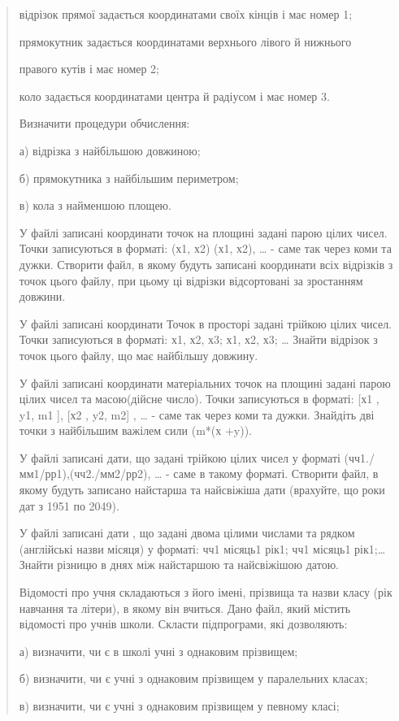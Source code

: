 \documentclass[]{article}
\begin{document}
\begin{quote}
відрізок прямої задається координатами своїх кінців і має номер 1;

прямокутник задається координатами верхнього лівого й нижнього

правого кутів і має номер 2;

коло задається координатами центра й радіусом і має номер 3.

Визначити процедури обчислення:

а) відрізка з найбільшою довжиною;

б) прямокутника з найбільшим периметром;

в) кола з найменшою площею.

У файлі записані координати точок на площині задані парою цілих чисел.
Точки записуються в форматі: (х1, х2) (х1, х2), \ldots{} - саме так
через коми та дужки. Створити файл, в якому будуть записані координати
всіх відрізків з точок цього файлу, при цьому ці відрізки відсортовані
за зростанням довжини.

У файлі записані координати Точок в просторі задані трійкою цілих чисел.
Точки записуються в форматі: х1, х2, х3; х1, х2, х3; \ldots{} Знайти
відрізок з точок цього файлу, що має найбільшу довжину.

У файлі записані координати матеріальних точок на площині задані парою
цілих чисел та масою(дійсне число). Точки записуються в форматі: {[}х1 ,
y1, m1 {]}, {[}х2 , y2, m2{]} , \ldots{} - саме так через коми та дужки.
Знайдіть дві точки з найбільшим важілем сили (m*(х +y)).

У файлі записані дати, що задані трійкою цілих чисел у форматі
(чч1./мм1/рр1),(чч2./мм2/рр2), \ldots{} - саме в такому форматі.
Створити файл, в якому будуть записано найстарша та найсвіжіша дати
(врахуйте, що роки дат з 1951 по 2049).

У файлі записані дати , що задані двома цілими числами та рядком
(англійські назви місяця) у форматі: чч1 місяць1 рік1; чч1 місяць1
рік1;\ldots{} Знайти різницю в днях між найстаршою та найсвіжішою датою.

Відомості про учня складаються з його імені, прізвища та назви класу
(рік навчання та літери), в якому він вчиться. Дано файл, який містить
відомості про учнів школи. Скласти підпрограми, які дозволяють:

а) визначити, чи є в школі учні з однаковим прізвищем;

б) визначити, чи є учні з однаковим прізвищем у паралельних класах;

в) визначити, чи є учні з однаковим прізвищем у певному класі;


\end{quote}
\end{document}
